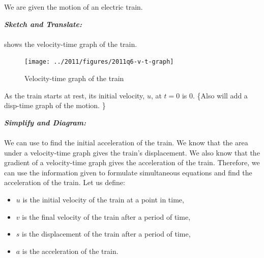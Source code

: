 %
%
%


\begin{subquestions}
	
\subquestion
We are given the motion of an electric train.

\begin{subsubquestions}
	
\subsubquestion

\textbf{\textit{Sketch and Translate:}} \\ \\
 shows the velocity-time graph of the train.
\begin{figure}[H]
	\begin{center}
		\texttt{[image: ../2011/figures/2011q6-v-t-graph]}
		\caption{\label{2011:q6:VTGraph} Velocity-time graph of the train}
	\end{center}
\end{figure}
As the train starts at rest, its initial velocity, $u$, at $t=0$ is 0.
\{Also will add a disp-time graph of the motion. \}


\subsubquestion

\textbf{\textit{Simplify and Diagram:}} \\ \\ 
We can use  to find the initial acceleration of the train. We know that the area under a velocity-time graph gives the train's displacement. We also know that the gradient of a velocity-time graph gives the acceleration of the train. Therefore, we can use the information given to formulate simultaneous equations and find the acceleration of  the train.
Let us define:
\begin{itemize}
	\item $u$ is the initial velocity of the train at a point in time,
	\item $v$ is the final velocity of the train after a period of time,
	\item $s$ is the displacement of the train after a period of time,
	\item $a$ is the acceleration of the train. 
\end{itemize}




\end{subsubquestions}
\end{subquestions}
